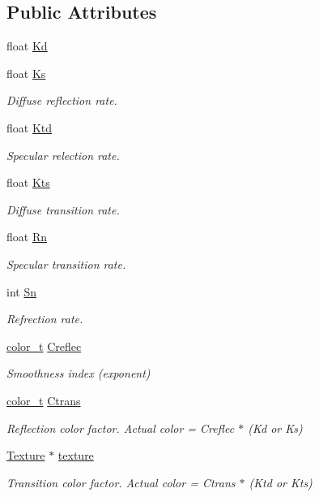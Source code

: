 \subsection*{Public Attributes}
\begin{DoxyCompactItemize}
\item 
float \hyperlink{structMaterial_a2db17351a8e462cc446520ae49e64350}{Kd}
\item 
float \hyperlink{structMaterial_acb75581ad97c1df67172d7d7ec59903d}{Ks}
\begin{DoxyCompactList}\small\item\em Diffuse reflection rate. \end{DoxyCompactList}\item 
float \hyperlink{structMaterial_adea51e78c45979bbbb46f04112ea133c}{Ktd}
\begin{DoxyCompactList}\small\item\em Specular relection rate. \end{DoxyCompactList}\item 
float \hyperlink{structMaterial_a75cacce03b4ccb56d436cc188f75ec0f}{Kts}
\begin{DoxyCompactList}\small\item\em Diffuse transition rate. \end{DoxyCompactList}\item 
float \hyperlink{structMaterial_a36c703d1fd25f5c21d9c30e8b403d849}{Rn}
\begin{DoxyCompactList}\small\item\em Specular transition rate. \end{DoxyCompactList}\item 
int \hyperlink{structMaterial_aa45a0497e5baffcebbbe13d5b737f353}{Sn}
\begin{DoxyCompactList}\small\item\em Refrection rate. \end{DoxyCompactList}\item 
\hyperlink{ray_8h_a8a2580fb65f7d3d4e24bdd412b9bd92d}{color\+\_\+t} \hyperlink{structMaterial_a9bc38e4305511b6b74a0df019317be0a}{Creflec}
\begin{DoxyCompactList}\small\item\em Smoothness index (exponent) \end{DoxyCompactList}\item 
\hyperlink{ray_8h_a8a2580fb65f7d3d4e24bdd412b9bd92d}{color\+\_\+t} \hyperlink{structMaterial_aca86e404d70ef98b5c1e466c9c20cee3}{Ctrans}
\begin{DoxyCompactList}\small\item\em Reflection color factor. Actual color = Creflec $\ast$ (Kd or Ks) \end{DoxyCompactList}\item 
\hyperlink{classTexture}{Texture} $\ast$ \hyperlink{structMaterial_ad151148dc3460f25435e951786171350}{texture}
\begin{DoxyCompactList}\small\item\em Transition color factor. Actual color = Ctrans $\ast$ (Ktd or Kts) \end{DoxyCompactList}\end{DoxyCompactItemize}


